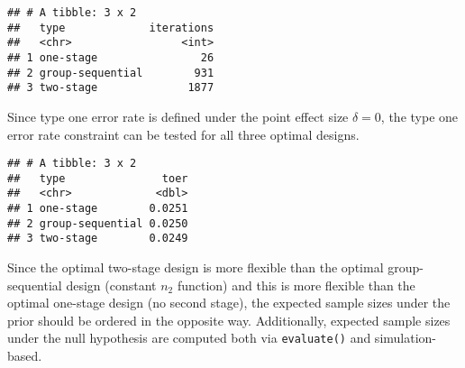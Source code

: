 \documentclass[]{book}
\newenvironment{Shaded}{\begin{snugshade}}{\end{snugshade}}
\newcommand{\DataTypeTok}[1]{\textcolor[rgb]{0.13,0.29,0.53}{#1}}
\newcommand{\DecValTok}[1]{\textcolor[rgb]{0.00,0.00,0.81}{#1}}
\newcommand{\FloatTok}[1]{\textcolor[rgb]{0.00,0.00,0.81}{#1}}
\newcommand{\KeywordTok}[1]{\textcolor[rgb]{0.13,0.29,0.53}{\textbf{#1}}}
\newcommand{\NormalTok}[1]{#1}
\newcommand{\OperatorTok}[1]{\textcolor[rgb]{0.81,0.36,0.00}{\textbf{#1}}}
\newcommand{\StringTok}[1]{\textcolor[rgb]{0.31,0.60,0.02}{#1}}
\begin{document}
\begin{verbatim}
## # A tibble: 3 x 2
##   type             iterations
##   <chr>                 <int>
## 1 one-stage                26
## 2 group-sequential        931
## 3 two-stage              1877
\end{verbatim}

Since type one error rate is defined under the point effect size \(\delta=0\),
the type one error rate constraint can be tested for all three optimal designs.

\begin{Shaded}
\end{Shaded}

\begin{verbatim}
## # A tibble: 3 x 2
##   type               toer
##   <chr>             <dbl>
## 1 one-stage        0.0251
## 2 group-sequential 0.0250
## 3 two-stage        0.0249
\end{verbatim}

Since the optimal two-stage design is more flexible than the optimal
group-sequential design (constant \(n_2\) function) and this is
more flexible than the optimal one-stage design (no second stage),
the expected sample sizes under the prior should be ordered in the opposite way.
Additionally, expected sample sizes under the null hypothesis
are computed both via \texttt{evaluate()} and simulation-based.
\end{document}
